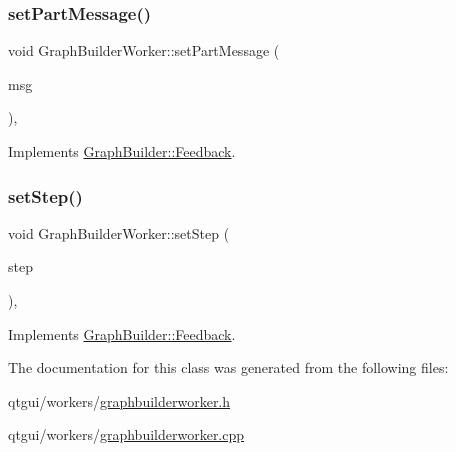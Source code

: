 \subsubsection{\texorpdfstring{setPartMessage()}{setPartMessage()}}
{\footnotesize\ttfamily void Graph\+Builder\+Worker\+::set\+Part\+Message (\begin{DoxyParamCaption}\item[{Q\+String}]{msg }\end{DoxyParamCaption})\hspace{0.3cm}{\ttfamily [override]}, {\ttfamily [virtual]}}



Implements \mbox{\hyperlink{class_graph_builder_1_1_feedback_a0a2b4ab63a8a85a79eb4f00695bde851}{Graph\+Builder\+::\+Feedback}}.

\mbox{\label{class_graph_builder_worker_ab152daded1da5a91383b9ad1ef512a03}} 
\subsubsection{\texorpdfstring{setStep()}{setStep()}}
{\footnotesize\ttfamily void Graph\+Builder\+Worker\+::set\+Step (\begin{DoxyParamCaption}\item[{int}]{step }\end{DoxyParamCaption})\hspace{0.3cm}{\ttfamily [override]}, {\ttfamily [virtual]}}



Implements \mbox{\hyperlink{class_graph_builder_1_1_feedback_a66a5931e6ddd5b54165125b39253f2ae}{Graph\+Builder\+::\+Feedback}}.



The documentation for this class was generated from the following files\+:\begin{DoxyCompactItemize}
\item 
qtgui/workers/\mbox{\hyperlink{graphbuilderworker_8h}{graphbuilderworker.\+h}}\item 
qtgui/workers/\mbox{\hyperlink{graphbuilderworker_8cpp}{graphbuilderworker.\+cpp}}\end{DoxyCompactItemize}
